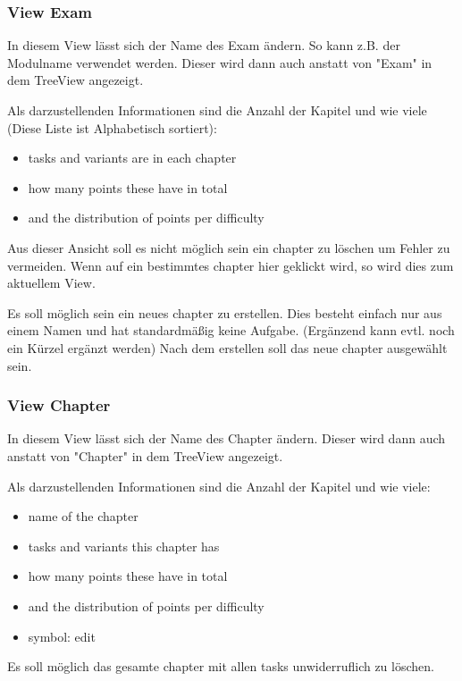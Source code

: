 \documentclass[a4paper]{article}
\begin{document}
\subsubsection{View Exam}

In diesem View lässt sich der Name des Exam ändern. So kann z.B. der Modulname verwendet werden. Dieser wird dann auch anstatt von "Exam" in dem TreeView angezeigt.

Als darzustellenden Informationen sind die Anzahl der Kapitel und wie viele (Diese Liste ist Alphabetisch sortiert):

\begin{itemize}
    \item tasks and variants are in each chapter
    \item how many points these have in total
    \item and the distribution of points per difficulty
\end{itemize}

Aus dieser Ansicht soll es nicht möglich sein ein chapter zu löschen um Fehler zu vermeiden. Wenn auf ein bestimmtes chapter hier geklickt wird, so wird dies zum aktuellem View.

Es soll möglich sein ein neues chapter zu erstellen. Dies besteht einfach nur aus einem Namen und hat standardmäßig keine Aufgabe. (Ergänzend kann evtl. noch ein Kürzel ergänzt werden) Nach dem erstellen soll das neue chapter ausgewählt sein.

\subsubsection{View Chapter}

In diesem View lässt sich der Name des Chapter ändern.  Dieser wird dann auch anstatt von "Chapter" in dem TreeView angezeigt.

Als darzustellenden Informationen sind die Anzahl der Kapitel und wie viele:

\begin{itemize}
    \item name of the chapter
    \item tasks and variants this chapter has
    \item how many points these have in total
    \item and the distribution of points per difficulty
    \item symbol: edit
\end{itemize}

Es soll möglich das gesamte chapter mit allen tasks unwiderruflich zu löschen.
\end{document}
